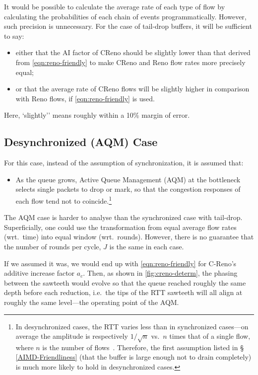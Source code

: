 It would be possible to calculate the average rate of each type of flow by calculating the probabilities of each chain of events programmatically. However, such precision is unnecessary. For the case of tail-drop buffers, it will be sufficient to say:
\begin{itemize}
	\item either that the AI factor of CReno should be slightly lower than that derived from \autoref{eqn:reno-friendly} to make CReno and Reno flow rates more precisely equal;
	\item or that the average rate of CReno flows will be slightly higher in comparison with Reno flows, if \autoref{eqn:reno-friendly} is used.
\end{itemize}
Here, `slightly''  means roughly within a 10\% margin of error.

\subsection{Desynchronized (AQM) Case}\label{AQM}

For this case, instead of the assumption of synchronization, it is assumed that:
\begin{itemize}[nosep]
	\item As the queue grows, Active Queue Management (AQM) at the bottleneck selects single packets to drop or mark, so that the congestion responses of each flow tend not to coincide.\footnote{In desynchronized cases, the RTT varies less than in synchronized cases---on average the amplitude is respectively \(1/\sqrt{n}\) vs.\ \(n\) times that of a single flow, where \(n\) is the number of flows~\cite{Appenzeller04:Sizing_buffers}. Therefore, the first assumption listed in \S\,\ref{AIMD-Friendliness} (that the buffer is large enough not to drain completely) is much more likely to hold in desynchronized cases.}
\end{itemize}

The AQM case is harder to analyse than the synchronized case with tail-drop. Superficially, one could use the transformation from equal average flow rates (wrt.\ time) into equal window (wrt.\ rounds). However, there is no guarantee that the number of rounds per cycle, \(J\) is the same in each case.

If we assumed it was, we would end up with \autoref{eqn:reno-friendly} for C-Reno's additive increase factor \(a_c\). Then, as shown in \autoref{fig:creno-determ}, the phasing between the sawteeth would evolve so that the queue reached roughly the same depth before each reduction, i.e.\ the tips of the RTT sawteeth will all align at roughly the same level---the operating point of the AQM. 

